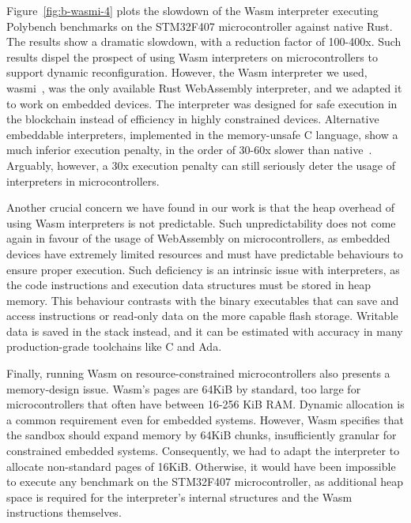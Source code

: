 Figure~\ref{fig:b-wasmi-4} plots the slowdown of the Wasm interpreter executing Polybench benchmarks on the STM32F407 microcontroller against native Rust. The results show a dramatic slowdown, with a reduction factor of 100-400x. Such results dispel the prospect of using Wasm interpreters on microcontrollers to support dynamic reconfiguration.
However, the Wasm interpreter we used, wasmi~\cite{wasmi}, was the only available Rust WebAssembly interpreter, and we adapted it to work on embedded devices. The interpreter was designed for safe execution in the blockchain instead of efficiency in highly constrained devices. 
Alternative embeddable interpreters, implemented in the memory-unsafe C language, show a much inferior execution penalty, in the order of 30-60x slower than native~\cite{peach2020ewasm}. Arguably, however, a 30x execution penalty can still seriously deter the usage of interpreters in microcontrollers.



Another crucial concern we have found in our work is that the heap overhead of using Wasm interpreters is not predictable. Such unpredictability does not come again in favour of the usage of WebAssembly on microcontrollers, as embedded devices have extremely limited resources and must have predictable behaviours to ensure proper execution. Such deficiency is an intrinsic issue with interpreters, as the code instructions and execution data structures must be stored in heap memory. This behaviour contrasts with the binary executables that can save and access instructions or read-only data on the more capable flash storage. Writable data is saved in the stack instead, and it can be estimated with accuracy in many production-grade toolchains like C and Ada.

Finally, running Wasm on resource-constrained microcontrollers also presents a memory-design issue. Wasm's pages are 64KiB by standard, too large for microcontrollers that often have between 16-256 KiB RAM. Dynamic allocation is a common requirement even for embedded systems. However, Wasm specifies that the sandbox should expand memory by 64KiB chunks, insufficiently granular for constrained embedded systems. Consequently, we had to adapt the interpreter to allocate non-standard pages of 16KiB. Otherwise, it would have been impossible to execute any benchmark on the STM32F407 microcontroller, as additional heap space is required for the interpreter's internal structures and the Wasm instructions themselves.

